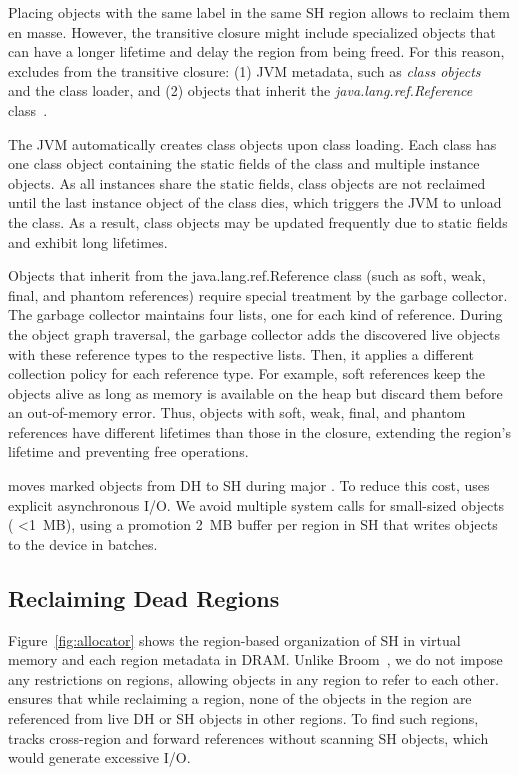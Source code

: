 Placing objects with the same label in the same SH region allows
\teraheapName{} to reclaim them en masse. However, the transitive closure
might include specialized objects that can have a longer lifetime and
delay the region from being freed. For this reason, \teraheapName{} excludes
from the transitive closure:
%
(1) JVM metadata, such as \emph{class
objects}~\cite{ClassJav88:online} and the class loader, and
%
(2) objects that inherit the \emph{java.lang.ref.Reference}
class~\cite{Referenc77:online}.

The JVM automatically creates class objects upon class loading. Each
class has one class object containing the static fields of the class
and multiple instance objects. As all instances share the static
fields, class objects are not reclaimed until the last instance object
of the class dies, which triggers the JVM to unload the class. As a
result, class objects may be updated frequently due to static fields
and exhibit long lifetimes.

Objects that inherit from the java.lang.ref.Reference class (such as
soft, weak, final, and phantom references) require special treatment
by the garbage collector. The garbage collector maintains four lists,
one for each kind of reference. During the object graph traversal, the
garbage collector adds the discovered live objects with these reference
types to the respective lists. Then, it applies a
different collection policy for each reference type. For example, soft
references keep the objects alive as long as memory is available on
the heap but discard them before an out-of-memory error.
Thus, objects with soft, weak, final, and phantom references have different
lifetimes than those in the closure, extending the region's lifetime and
preventing free operations.

\teraheapName{} moves marked objects from DH to SH during major \teraheapGC. To reduce
this cost, \teraheapName{} uses explicit asynchronous I/O. We avoid multiple
system calls for small-sized objects ( <\SI{1}{MB}), using a promotion
\SI{2}{MB} buffer per region in SH that writes objects to the device
in batches.

\subsection{Reclaiming Dead Regions}
\label{sec:free}
Figure~\ref{fig:allocator} shows the region-based organization of SH
in virtual memory and each region metadata in DRAM. Unlike
Broom~\cite{gog:broom}, we do not impose any restrictions on regions,
allowing objects in any region to refer to each other. \teraheapName{} ensures
that while reclaiming a region, none of the objects in the region are
referenced from live DH or SH objects in other regions. To find such
regions, \teraheapName{} tracks cross-region and forward references without
scanning SH objects, which would generate excessive I/O.

